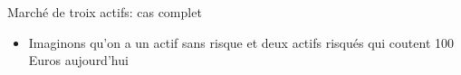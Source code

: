 \documentclass[10pt]{beamer}
\begin{document}
\begin{frame}{Marché de troix actifs: cas complet}{}
  \begin{itemize}
    \item Imaginons qu'on a un actif sans risque et deux actifs risqués qui coutent 100 Euros aujourd'hui\\~\\
  \end{itemize}
  
 

\begin{figure}[t]
\centering



\end{figure}

\end{frame}
\end{document}
